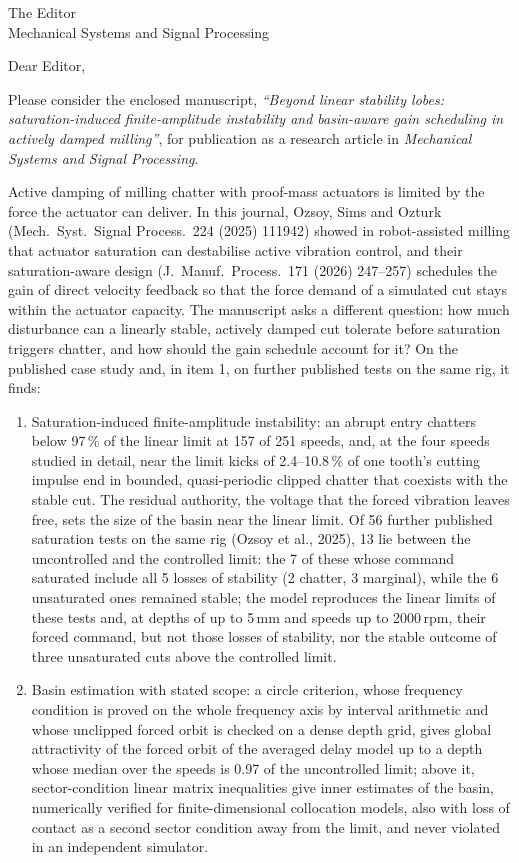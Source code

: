 \documentclass[11pt]{letter}
\begin{document}
\begin{letter}{The Editor\\ Mechanical Systems and Signal Processing}
\opening{Dear Editor,}

Please consider the enclosed manuscript, \emph{``Beyond linear stability lobes: saturation-induced finite-amplitude instability and basin-aware gain scheduling in actively damped milling''}, for publication as a research article in \emph{Mechanical Systems and Signal Processing}.

Active damping of milling chatter with proof-mass actuators is limited by the force the actuator can deliver. In this journal, Ozsoy, Sims and Ozturk (Mech.\ Syst.\ Signal Process.\ 224 (2025) 111942) showed in robot-assisted milling that actuator saturation can destabilise active vibration control, and their saturation-aware design (J.\ Manuf.\ Process.\ 171 (2026) 247--257) schedules the gain of direct velocity feedback so that the force demand of a simulated cut stays within the actuator capacity. The manuscript asks a different question: how much disturbance can a linearly stable, actively damped cut tolerate before saturation triggers chatter, and how should the gain schedule account for it? On the published case study and, in item 1, on further published tests on the same rig, it finds:
\begin{enumerate}
\item Saturation-induced finite-amplitude instability: an abrupt entry chatters below 97\,\% of the linear limit at 157 of 251 speeds, and, at the four speeds studied in detail, near the limit kicks of 2.4--10.8\,\% of one tooth's cutting impulse end in bounded, quasi-periodic clipped chatter that coexists with the stable cut. The residual authority, the voltage that the forced vibration leaves free, sets the size of the basin near the linear limit. Of 56 further published saturation tests on the same rig (Ozsoy et al., 2025), 13 lie between the uncontrolled and the controlled limit: the 7 of these whose command saturated include all 5 losses of stability (2 chatter, 3 marginal), while the 6 unsaturated ones remained stable; the model reproduces the linear limits of these tests and, at depths of up to 5\,mm and speeds up to 2000\,rpm, their forced command, but not those losses of stability, nor the stable outcome of three unsaturated cuts above the controlled limit.
\item Basin estimation with stated scope: a circle criterion, whose frequency condition is proved on the whole frequency axis by interval arithmetic and whose unclipped forced orbit is checked on a dense depth grid, gives global attractivity of the forced orbit of the averaged delay model up to a depth whose median over the speeds is 0.97 of the uncontrolled limit; above it, sector-condition linear matrix inequalities give inner estimates of the basin, numerically verified for finite-dimensional collocation models, also with loss of contact as a second sector condition away from the limit, and never violated in an independent simulator.

\end{enumerate}
\end{letter}
\end{document}
